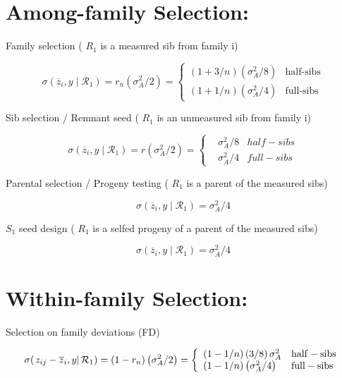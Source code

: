 \documentclass{article}
\begin{document}
\section{Among-family Selection:}
Family selection ( $ R_{1} $ is a measured sib from family i)

\begin{equation}
\sigma(\overline{z}_{i},y\mid\mathcal{R}_{1})=r_{n}\left(\sigma_{A}^{2}/2\right)=\left\{\begin{array}{ll}(1+3/n)\left(\sigma_{A}^{2}/8\right)&\text{half-sibs}\\ (1+1/n)\left(\sigma_{A}^{2}/4\right)&\text{full-sibs}\end{array}\right.
\end{equation}

Sib selection / Remnant seed ( $ R_{1} $ is an unmeasured sib from family i)

\begin{equation}
\sigma(\overline{z}_{i},y\mid\mathcal{R}_{1})=r\left(\sigma_{A}^{2}/2\right)=\left\{\begin{aligned}&\sigma_{A}^{2}/8&half-sibs\\&\sigma_{A}^{2}/4&full-sibs\end{aligned}\right.
\end{equation}

Parental selection / Progeny testing ( $ R_{1} $ is a parent of the measured sibs)

\begin{equation}
\sigma(\overline{z}_{i},y\mid\mathcal{R}_{1})=\sigma_{A}^{2}/4
\end{equation}

 $ S_{1} $ seed design ( $ R_{1} $ is a selfed progeny of a parent of the measured sibs)

\begin{equation}
\sigma(\overline{z}_{i},y\mid\mathcal{R}_{1})=\sigma_{A}^{2}/4
\end{equation}

\section{Within-family Selection:}
Selection on family deviations (FD)

\begin{equation}
\sigma(\left.z_{i j}-\overline{z}_{i},y\right|\mathcal{R}_{1})=\left(1-r_{n}\right)\left(\sigma_{A}^{2}/2\right)=\left\{\begin{array}{l l}\left(1-1/n\right)\left(3/8\right)\sigma_{A}^{2}&\mathrm{h a l f-s i b s}\\ \left(1-1/n\right)\left(\sigma_{A}^{2}/4\right)&\mathrm{f u l l-s i b s}\end{array}\right.
\end{equation}
\end{document}
